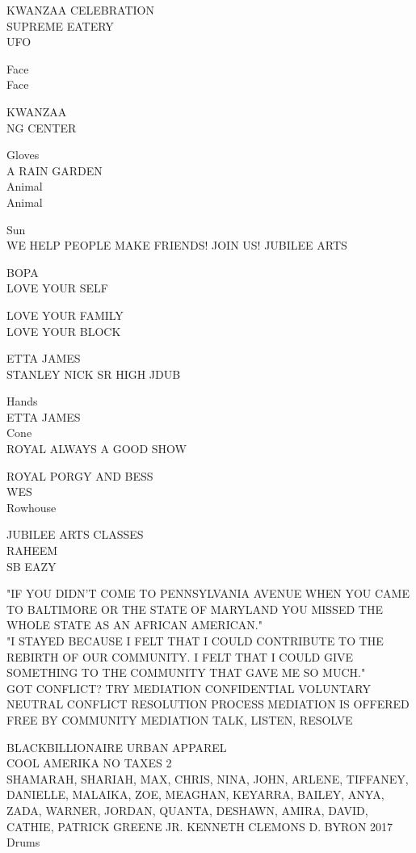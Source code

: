\documentclass[10pt,letterpaper]{article}
\begin{document}
KWANZAA CELEBRATION\\
SUPREME EATERY\\
UFO

Face\\
Face

KWANZAA\\
NG CENTER

Gloves\\
A RAIN GARDEN\\
Animal\\
Animal

Sun\\
WE HELP PEOPLE MAKE FRIENDS!  JOIN US!  JUBILEE ARTS

BOPA\\
LOVE YOUR SELF

LOVE YOUR FAMILY\\
LOVE YOUR BLOCK

ETTA JAMES\\
STANLEY NICK SR HIGH JDUB

Hands\\
ETTA JAMES\\
Cone\\
ROYAL ALWAYS A GOOD SHOW

ROYAL PORGY AND BESS\\
WES\\
Rowhouse

JUBILEE ARTS CLASSES\\
RAHEEM\\
SB EAZY

"IF YOU DIDN'T COME TO PENNSYLVANIA AVENUE WHEN YOU CAME TO BALTIMORE OR THE STATE OF MARYLAND YOU MISSED THE WHOLE STATE AS AN AFRICAN AMERICAN."\\
"I STAYED BECAUSE I FELT THAT I COULD CONTRIBUTE TO THE REBIRTH OF OUR COMMUNITY.  I FELT THAT I COULD GIVE SOMETHING TO THE COMMUNITY THAT GAVE ME SO MUCH."\\
GOT CONFLICT?  TRY MEDIATION CONFIDENTIAL VOLUNTARY NEUTRAL CONFLICT RESOLUTION PROCESS MEDIATION IS OFFERED FREE BY COMMUNITY MEDIATION TALK, LISTEN, RESOLVE

BLACKBILLIONAIRE URBAN APPAREL\\
COOL AMERIKA NO TAXES 2\\
SHAMARAH, SHARIAH, MAX, CHRIS, NINA, JOHN, ARLENE, TIFFANEY, DANIELLE, MALAIKA, ZOE, MEAGHAN, KEYARRA, BAILEY, ANYA, ZADA, WARNER, JORDAN, QUANTA, DESHAWN, AMIRA, DAVID, CATHIE, PATRICK GREENE JR. KENNETH CLEMONS D. BYRON 2017\\
Drums
\end{document}
